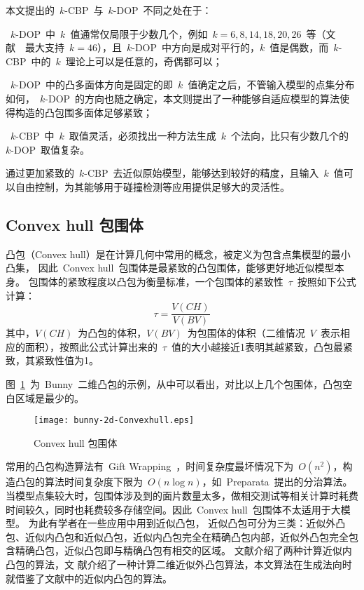 本文提出的~$k$-CBP~与~$k$-DOP~不同之处在于：\\ \indent
\begin{inparaenum}[(1)]
\item ~$k$-DOP~中~$k$~值通常仅局限于少数几个，例如~$k=6,8,14,18,20,26$~等\cite{klosowski1998efficient}（文献~~最大支持~$k=46$），且~$k$-DOP~中方向是成对平行的，$k$~值是偶数，而~$k$-CBP~中的~$k$~理论上可以是任意的，奇偶都可以；\\ \indent
\item ~$k$-DOP~中的凸多面体方向是固定的即~$k$~值确定之后，不管输入模型的点集分布如何，~$k$-DOP~的方向也随之确定，本文则提出了一种能够自适应模型的算法使得构造的凸包围多面体足够紧致；\\ \indent
\item ~$k$-CBP~中~$k$~取值灵活，必须找出一种方法生成~$k$~个法向，比只有少数几个的~$k$-DOP~取值复杂。\\ \indent
\end{inparaenum} 
通过更加紧致的~$k$-CBP~去近似原始模型，能够达到较好的精度，且输入~$k$~值可以自由控制，为其能够用于碰撞检测等应用提供足够大的灵活性。

\subsection{Convex hull 包围体}
\label{subsec:convexhull}

凸包（Convex hull）是在计算几何中常用的概念，被定义为包含点集模型的最小凸集\cite{dengcg}，
因此~Convex hull~包围体是最紧致的凸包围体，能够更好地近似模型本身。
包围体的紧致程度以凸包为衡量标准，一个包围体的紧致性~$\tau$~按照如下公式计算：
\begin{equation}
\label{equa:judge:tightness}
\tau = \frac{V(CH)}{V(BV)}
\end{equation}
其中，$V(CH)$~为凸包的体积，$V(BV)$~为包围体的体积（二维情况~$V$~表示相应的面积），按照此公式计算出来的~$\tau$~值的大小越接近1表明其越紧致，凸包最紧致，其紧致性值为1。

图~\ref{fig:convexhull-bunny}~为~Bunny~二维凸包的示例，从中可以看出，对比以上几个包围体，凸包空白区域是最少的。
\begin{figure}[H] %
  \centering
  \texttt{[image: bunny-2d-Convexhull.eps]}
  \caption{Convex hull 包围体}
  \label{fig:convexhull-bunny}
\end{figure}
常用的凸包构造算法有~Gift Wrapping~\cite{Chand1970An}，时间复杂度最坏情况下为~$O(n^2)$，构造凸包的算法时间复杂度下限为~$O(n\log n)$，如~Preparata~提出的分治算法\cite{Preparata1977}。
当模型点集较大时，包围体涉及到的面片数量太多，做相交测试等相关计算时耗费时间较久，同时也耗费较多存储空间。因此~Convex hull~包围体不太适用于大模型。
为此有学者在一些应用中用到近似凸包，
近似凸包可分为三类：近似外凸包、近似内凸包和近似凸包\cite{hossain2013constructing}，近似内凸包完全在精确凸包内部，近似外凸包完全包含精确凸包，近似凸包即与精确凸包有相交的区域。
文献介绍了两种计算近似内凸包的算法，文
献介绍了一种计算二维近似外凸包算法，本文算法在生成法向时就借鉴了文献中的近似内凸包的算法。

